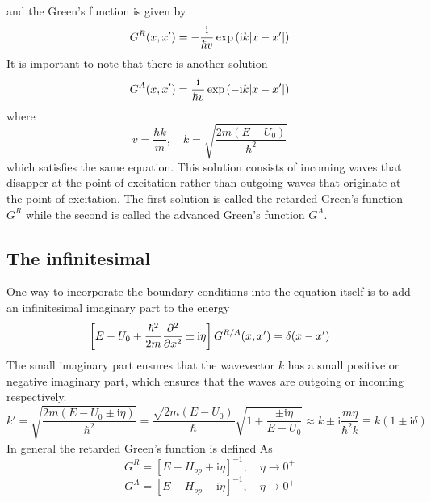 \documentclass[11pt,a4paper]{book}
\theoremstyle{plain}
\theoremstyle{definition}
\theoremstyle{remark}
\newcommand{\ii}{\mathrm{i}}                      %
\begin{document}
and the Green's function is given by
\begin{equation}
    G^R(x,x') = -\frac{\ii}{\hbar v} \exp\left(\ii k \abs{x - x'}\right)
\end{equation}
It is important to note that there is another solution
\begin{equation}
    G^A(x,x') = \frac{\ii}{\hbar v} \exp\left(-\ii k \abs{x - x'}\right)
\end{equation}
where
\begin{equation}
    v = \frac{\hbar k}{m},\quad k = \sqrt{\frac{2 m (E - U_0)}{\hbar^2}}
\end{equation}
which satisfies the same equation. This solution consists of incoming waves that disapper at the point of excitation rather than outgoing waves that originate at the point of excitation. The first solution is called the retarded Green's function $G^R$ while the second is called the advanced Green's function $G^A$. 
\subsection{The infinitesimal}
One way to incorporate the boundary conditions into the equation itself is to add an infinitesimal imaginary part to the energy
\begin{equation}
    \left[ E - U_0 + \frac{\hbar^2}{2m}\pdv{^2}{x^2} \pm \ii \eta \right] G^{R/A}(x,x') = \delta(x-x')
\end{equation}
The small imaginary part ensures that the wavevector $k$ has a small positive or negative imaginary part, which ensures that the waves are outgoing or incoming respectively.
\begin{equation}
    k' = \sqrt{\frac{2 m (E - U_0 \pm \ii \eta)}{\hbar^2}} = \frac{\sqrt{2m(E-U_0)}}{\hbar}\sqrt{1+ \frac{\pm \ii \eta}{E-U_0}} \approx k \pm \ii \frac{m \eta}{\hbar^2 k} \equiv k(1\pm \ii \delta)
\end{equation}
In general the retarded Green's function is defined As
\begin{equation}
    G^R = \left[E - H_{op} + \ii \eta \right]^{-1}, \quad \eta \to 0^+
\end{equation}
\begin{equation}
    G^A = \left[E - H_{op} - \ii \eta \right]^{-1}, \quad \eta \to 0^+
\end{equation}
\end{document}
